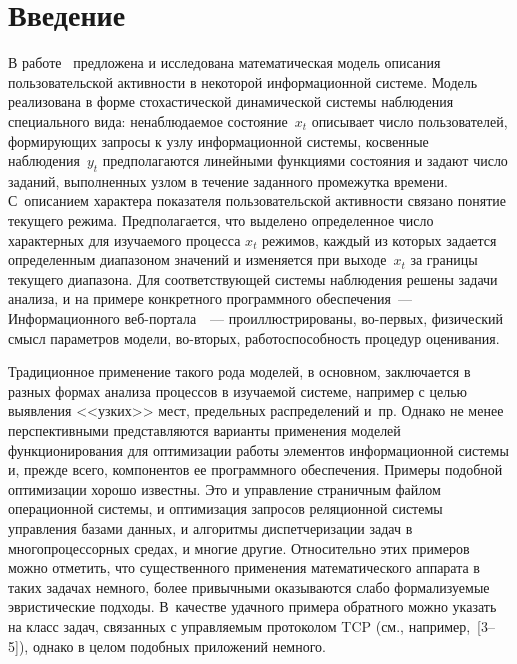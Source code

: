      \begin{multicols}{2}
      
            \label{st\stat}

\section{Введение}
  
  В работе~\cite{1bos} предложена и исследована математическая модель описания 
пользовательской активности в некоторой информационной системе. Модель реализована в 
форме стохастической динамической системы наблюдения специального вида: 
ненаблюдаемое состояние~$x_t$ описывает число пользователей, формирующих запросы к 
узлу информационной системы, косвенные наблюдения~$y_t$ предполагаются линейными 
функциями состояния и задают число заданий, выполненных узлом в течение заданного 
промежутка времени. С~описанием характера показателя пользовательской активности 
связано понятие текущего режима. Предполагается, что выделено определенное число 
характерных для изучаемого процесса $x_t$ режимов, каждый из которых задается 
определенным диапазоном значений и изменяется при выходе~$x_t$ за границы текущего 
диапазона. Для соответствующей системы наблюдения решены задачи анализа, и на примере 
конкретного программного обеспечения~--- Информационного веб-пор\-та\-ла~\cite{2bos}~--- 
проиллюстрированы, во-первых, физический смысл параметров модели, во-вторых, 
работоспособность процедур оценивания.
  
  Традиционное применение такого рода моделей, в основном, заключается в разных формах 
анализа процессов в изучаемой системе, например с целью выявления <<узких>> мест, 
предельных распределений и~пр. Однако не менее перспективными представляются 
варианты применения моделей функционирования для оптимизации работы элементов 
информационной системы и, прежде всего, компонентов ее программного обеспечения. 
Примеры подобной оптимизации хорошо известны. Это и управление страничным файлом 
операционной системы, и оптимизация запросов реляционной системы управления базами 
данных, и алгоритмы диспетчеризации задач в многопроцессорных средах, и многие другие. 
Относительно этих примеров можно отметить, что существенного применения 
математического аппарата в таких задачах немного, более привычными оказываются слабо 
формализуемые эвристические подходы. В~качестве удачного примера обратного можно 
указать на класс задач, связанных с управляемым протоколом TCP (см., например,~[3--5]), 
однако в целом подобных приложений немного.
  

\end{multicols}
